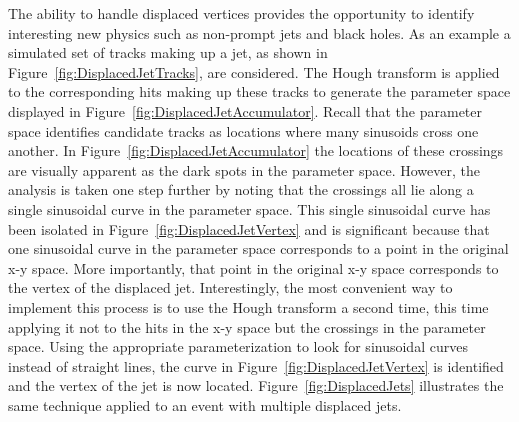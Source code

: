\documentclass{JINST}
\begin{document}
The ability to handle displaced vertices provides the opportunity to identify interesting new physics such as non-prompt
jets and black holes. As an example a simulated set of tracks making up a jet, as shown in
Figure~\ref{fig:DisplacedJetTracks}, are considered.  The Hough transform is applied to the corresponding hits making up these
tracks to generate the parameter space displayed in Figure~\ref{fig:DisplacedJetAccumulator}. Recall that the parameter
space identifies candidate tracks as locations where many sinusoids cross one another. In
Figure~\ref{fig:DisplacedJetAccumulator} the locations of these crossings are visually apparent as the dark spots in
the parameter space.  However, the analysis is taken one step further by noting that the crossings all lie along a
single sinusoidal curve in the parameter space.  This single sinusoidal curve has been isolated in
Figure~\ref{fig:DisplacedJetVertex} and is significant because that one sinusoidal curve in the parameter space
corresponds to a point in the original x-y space.  More importantly, that point in the original x-y space corresponds to
the vertex of the displaced jet.  Interestingly, the most convenient way to implement this process is to use the Hough
transform a second time, this time applying it not to the hits in the x-y space but the crossings in the parameter
space.  Using the appropriate parameterization to look for sinusoidal curves instead of straight lines, the curve in
Figure~\ref{fig:DisplacedJetVertex} is identified and the vertex of the jet is now located.
Figure~\ref{fig:DisplacedJets} illustrates the same technique applied to an event with multiple displaced jets.
\end{document}

